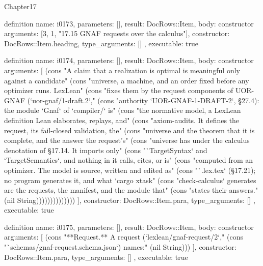 \begin{lexlean}{Chapter17}
\begin{semanticmodule}
definition{
  name: i0173,
  parameters: [],
  result: DocRows::Item,
  body: constructor{
    arguments: [3, 1, "17.15 GNAF requests over the calculus"],
    constructor: DocRows::Item.heading,
    type_arguments: []
  },
  executable: true
}

definition{
  name: i0174,
  parameters: [],
  result: DocRows::Item,
  body: constructor{
    arguments: [
      (cons "A claim that a realization is optimal is meaningful only against a candidate" (cons "universe, a machine, and an order fixed before any optimizer runs. LexLean" (cons "fixes them by the request components of UOR-GNAF (`uor-gnaf/1-draft.2`," (cons "authority `UOR-GNAF-1-DRAFT-2`, §27.4): the module `Gnaf` of `compiler/` is" (cons "the normative model, a LexLean definition Lean elaborates, replays, and" (cons "axiom-audits. It defines the request, its fail-closed validation, the" (cons "universe and the theorem that it is complete, and the answer the request's" (cons "universe has under the calculus denotation of §17.14. It imports only" (cons "`TargetSyntax` and `TargetSemantics`, and nothing in it calls, cites, or is" (cons "computed from an optimizer. The model is source, written and edited as" (cons "`.lex.tex` (§17.21); no program generates it, and what `cargo xtask" (cons "check-calculus` generates are the requests, the manifest, and the module that" (cons "states their answers." (nil String))))))))))))))
    ],
    constructor: DocRows::Item.para,
    type_arguments: []
  },
  executable: true
}

definition{
  name: i0175,
  parameters: [],
  result: DocRows::Item,
  body: constructor{
    arguments: [
      (cons "**Request.** A request (`lexlean/gnaf-request/2`," (cons "`schemas/gnaf-request.schema.json`) names:" (nil String)))
    ],
    constructor: DocRows::Item.para,
    type_arguments: []
  },
  executable: true
}


\end{semanticmodule}
\end{lexlean}
